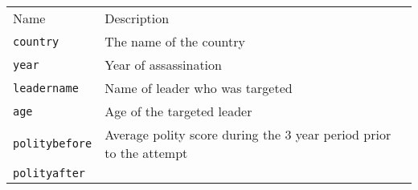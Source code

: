 \documentclass[]{article}
\begin{document}
\begin{longtable}[c]{@{}ll@{}}
\toprule\addlinespace
\begin{minipage}[b]{0.25\columnwidth}\raggedright
Name
\end{minipage} & \begin{minipage}[b]{0.68\columnwidth}\raggedright
Description
\end{minipage}
\\\addlinespace
\midrule\endhead
\begin{minipage}[t]{0.25\columnwidth}\raggedright
\texttt{country}
\end{minipage} & \begin{minipage}[t]{0.68\columnwidth}\raggedright
The name of the country
\end{minipage}
\\\addlinespace
\begin{minipage}[t]{0.25\columnwidth}\raggedright
\texttt{year}
\end{minipage} & \begin{minipage}[t]{0.68\columnwidth}\raggedright
Year of assassination
\end{minipage}
\\\addlinespace
\begin{minipage}[t]{0.25\columnwidth}\raggedright
\texttt{leadername}
\end{minipage} & \begin{minipage}[t]{0.68\columnwidth}\raggedright
Name of leader who was targeted
\end{minipage}
\\\addlinespace
\begin{minipage}[t]{0.25\columnwidth}\raggedright
\texttt{age}
\end{minipage} & \begin{minipage}[t]{0.68\columnwidth}\raggedright
Age of the targeted leader
\end{minipage}
\\\addlinespace
\begin{minipage}[t]{0.25\columnwidth}\raggedright
\texttt{politybefore}
\end{minipage} & \begin{minipage}[t]{0.68\columnwidth}\raggedright
Average polity score during the 3 year period prior to the attempt
\end{minipage}
\\\addlinespace
\begin{minipage}[t]{0.25\columnwidth}\raggedright
\texttt{polityafter}
\end{minipage} & \begin{minipage}[t]{0.68\columnwidth}\raggedright

\end{minipage}
\end{longtable}
\end{document}
